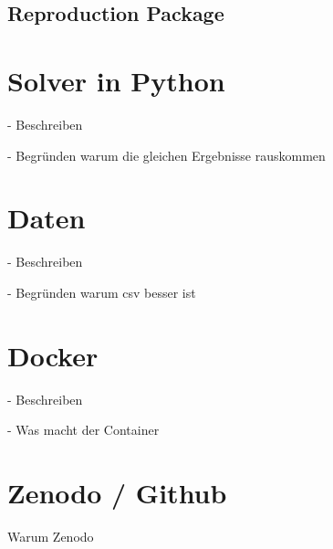 \documentclass{article}
\begin{document}
\begin{center}
\section*{Reproduction Package}
\end{center}
\begin{multicols}{2}

\section{Solver in Python}
- Beschreiben

- Begründen warum die gleichen Ergebnisse rauskommen

\section{Daten}
- Beschreiben 

- Begründen warum csv besser ist 

\section{Docker}
- Beschreiben

- Was macht der Container

\section{Zenodo / Github}
Warum Zenodo  


\end{multicols}
\end{document}
